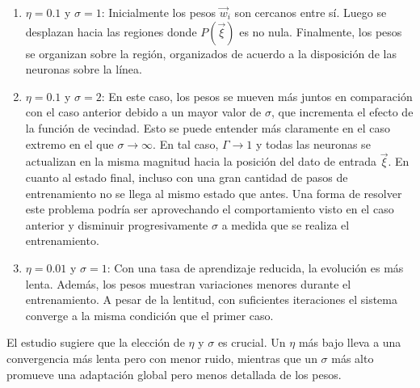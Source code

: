 \documentclass[aps,prb,twocolumn,superscriptaddress,floatfix,longbibliography]{revtex4-2}
\newcounter{para}
\begin{document}
\begin{enumerate}
    \item \(\eta = 0.1\) y \(\sigma = 1\): Inicialmente los pesos \(\vec{w}_i\) son cercanos entre sí. Luego se desplazan hacia las regiones donde \(P(\vec{\xi})\) es no nula. Finalmente, los pesos se organizan sobre la región, organizados de acuerdo a la disposición de las neuronas sobre la línea.

    \item \(\eta = 0.1\) y \(\sigma = 2\): En este caso, los pesos se mueven más juntos en comparación con el caso anterior debido a un mayor valor de \(\sigma\), que incrementa el efecto de la función de vecindad. Esto se puede entender más claramente en el caso extremo en el que $\sigma \rightarrow \infty$. En tal caso, $\Gamma \rightarrow 1$ y todas las neuronas se actualizan en la misma magnitud hacia la posición del dato de entrada $\vec{\xi}$. En cuanto al estado final, incluso con una gran cantidad de pasos de entrenamiento no se llega al mismo estado que antes. Una forma de resolver este problema podría ser aprovechando el comportamiento visto en el caso anterior y disminuir progresivamente $\sigma$ a medida que se realiza el entrenamiento.
    

    \item \(\eta = 0.01\) y \(\sigma = 1\): Con una tasa de aprendizaje reducida, la evolución es más lenta. Además, los pesos muestran variaciones menores durante el entrenamiento. A pesar de la lentitud, con suficientes iteraciones el sistema converge a la misma condición que el primer caso.

\end{enumerate}

El estudio sugiere que la elección de \(\eta\) y \(\sigma\) es crucial. Un \(\eta\) más bajo lleva a una convergencia más lenta pero con menor ruido, mientras que un \(\sigma\) más alto promueve una adaptación global pero menos detallada de los pesos. 


\onecolumngrid
\end{document}

